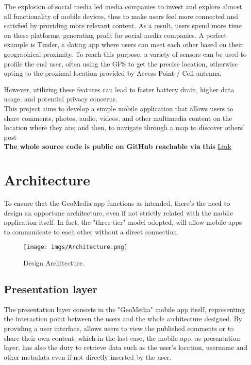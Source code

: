 \documentclass[conference]{IEEEtran}
\begin{document}
The explosion of social media led media companies to invest and explore almost all functionality of mobile devices, thus to make users feel more connected and satisfied by providing more relevant content. As a result, users spend more time on these platforms, generating profit for social media companies.
A perfect example is Tinder, a dating app where users can meet each other based on their geographical proximity.
To reach this purpose, a variety of sensors can be used to profile the end user, often using the GPS to get the precise location, otherwise opting to the proximal location provided by Access Point / Cell antenna.

However, utilizing these features can lead to faster battery drain, higher data usage, and potential privacy concerns.
\\
This project aims to develop a simple mobile application that allows users to share comments, photos, audio, videos, and other multimedia content on the location where they are; and then, to navigate through a map to discover others' post
\\
\textbf{The whole source code is public on GitHub reachable via this} \href{https://github.com/albertomorini/GeoMedia}{Link}


\section{Architecture}


To ensure that the GeoMedia app functions as intended, there's the need to design an opportune architecture, even if not strictly related with the mobile application itself.
In fact, the "three-tier" model adopted, will allow mobile apps to communicate to each other without a direct connection.

\begin{figure}[htbp]
{\texttt{[image: imgs/Architecture.png]}}
\caption{Design Architecture.}
\label{fig}
\end{figure}

\subsection{Presentation layer}
The presentation layer consists in the "GeoMedia" mobile app itself, representing the interaction point between the users and the whole architecture designed.
By providing a user interface, allows users to view the published comments or to share their own content; which in the last case, the mobile app, as presentation layer, has also the duty to retrieve data such as the user's location, username and other metadata even if not directly inserted by the user.
\end{document}
